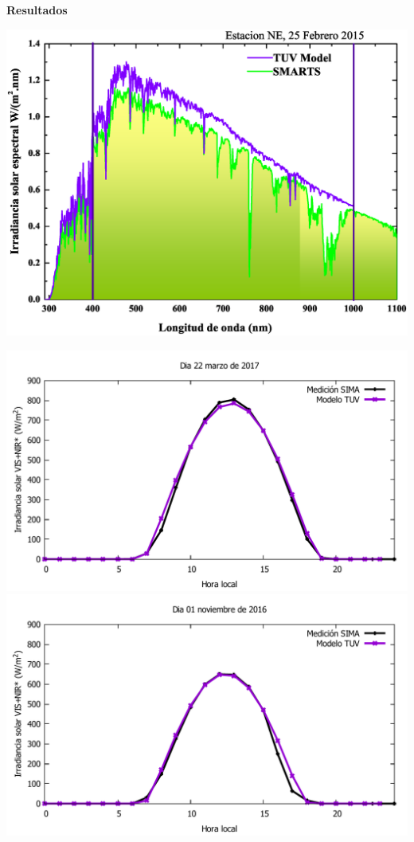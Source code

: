 \documentclass{article}
\begin{document}
\begin{center}
\begin{shaded}
\textbf{\textcolor{ver}{Resultados}}
\end{shaded}
\end{center}
\hspace{-1.3cm}
\begin{minipage}{0.53\linewidth}
\begin{minipage}{0.6\linewidth}
\includegraphics[scale=0.33]{images/espectro.eps}
\end{minipage}
\hspace{-0.4cm}
\begin{minipage}{0.4\linewidth}
\includegraphics[scale=0.32]{images/med1.pdf}\\
\includegraphics[scale=0.32]{images/med2.pdf}

\end{minipage}
\end{minipage}
\end{document}

